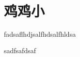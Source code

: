 \cleardoublepage
\section{鸡鸡小}
\begin{this_body}
fadsaflhdjsalfhdsalfhldsa\par
sadfsafdsaf
\end{this_body}
